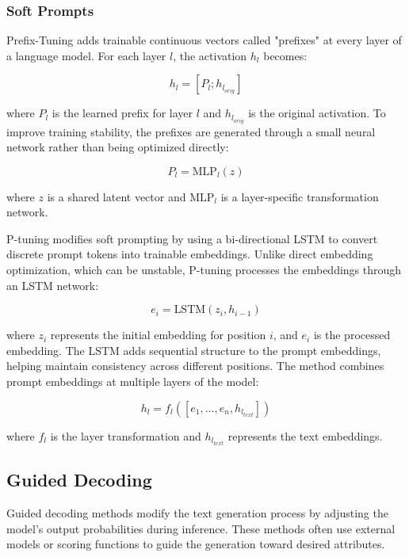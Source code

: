 \subsubsection{Soft Prompts}

Prefix-Tuning adds trainable continuous vectors called "prefixes" at every layer of a language model. For each layer $l$, the activation $h_l$ becomes:

\begin{equation}
    h_l = [P_l; h_{l_{orig}}]
\end{equation}

where $P_l$ is the learned prefix for layer $l$ and $h_{l_{orig}}$ is the original activation. To improve training stability, the prefixes are generated through a small neural network rather than being optimized directly:

\begin{equation}
    P_l = \text{MLP}_l(z)
\end{equation}

where $z$ is a shared latent vector and $\text{MLP}_l$ is a layer-specific transformation network.

P-tuning modifies soft prompting by using a bi-directional LSTM to convert discrete prompt tokens into trainable embeddings. Unlike direct embedding optimization, which can be unstable, P-tuning processes the embeddings through an LSTM network:

\begin{equation}
    e_i = \text{LSTM}(z_i, h_{i-1})
\end{equation}

where $z_i$ represents the initial embedding for position $i$, and $e_i$ is the processed embedding. The LSTM adds sequential structure to the prompt embeddings, helping maintain consistency across different positions. The method combines prompt embeddings at multiple layers of the model:

\begin{equation}
    h_l = f_l([e_1, ..., e_n, h_{l_{text}}])
\end{equation}

where $f_l$ is the layer transformation and $h_{l_{text}}$ represents the text embeddings.

\subsection{Guided Decoding}

Guided decoding methods modify the text generation process by adjusting the model's output probabilities during inference. These methods often use external models or scoring functions to guide the generation toward desired attributes.

